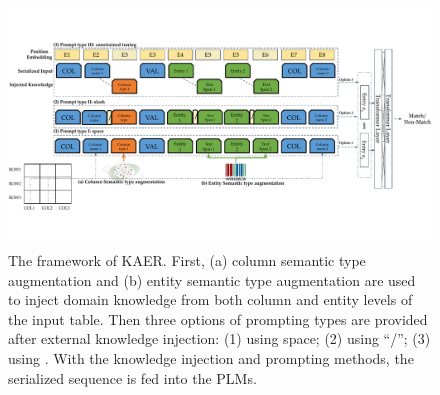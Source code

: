 \begin{figure}[!ht]
    \centering
    \includegraphics[width=\linewidth]{plots/DCER_short.pdf}
    \vspace{-0.7cm}
    \caption{The framework of KAER. First, (a) column semantic type augmentation and (b) entity semantic type augmentation are used to inject domain knowledge from both column and entity levels of the input table. 
    Then three options of prompting types are provided after external knowledge injection: (1) using space; (2) using ``/''; (3) using . 
    With the knowledge injection and prompting methods, the serialized sequence is fed into the PLMs.}
    \vspace{-0.5cm}
    \label{fig:framework}
\end{figure}



